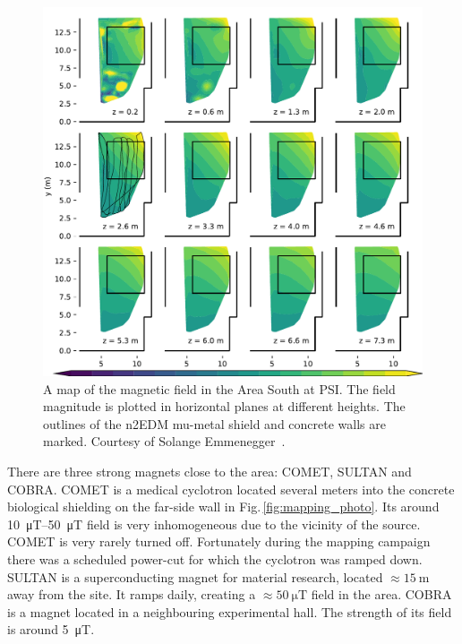\begin{figure}
  \centering
  \includegraphics[width=\linewidth]{gfx/mapping/Michals_plot.pdf}
  \caption{A map of the magnetic field in the Area South at PSI\@. The field magnitude is plotted in horizontal planes at different heights. The outlines of the n2EDM mu-metal shield and concrete walls are marked.
  Courtesy of Solange Emmenegger~\cite{EmmeneggerThesis}.
  }\label{fig:mapping_p-i_map}
\end{figure}

There are three strong magnets close to the area: COMET, SULTAN and COBRA\@.
COMET is a medical cyclotron located several meters into the concrete biological shielding on the far-side wall in Fig.\,\ref{fig:mapping_photo}.
Its around \SIrange[range-phrase=--,range-units=single]{10}{50}{\micro\tesla} field is very inhomogeneous due to the vicinity of the source.
COMET is very rarely turned off.
Fortunately during the mapping campaign there was a scheduled power-cut for which the cyclotron was ramped down.
SULTAN is a superconducting magnet for material research, located $\approx \SI{15}{\metre}$ away from the site.
It ramps daily, creating a $\approx \SI{50}{\micro\tesla}$ field in the area.
COBRA is a magnet located in a neighbouring experimental hall.
The strength of its field is around \SI{5}{\micro\tesla}.

